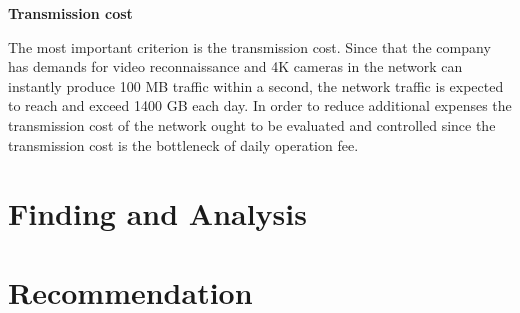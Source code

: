 \documentclass[12pt]{article}
\begin{document}
	\textbf{Transmission cost} \par 
	The most important criterion is the transmission cost. Since that the company has demands for video reconnaissance and 4K cameras in the network can instantly produce 100 MB traffic within a second, the network traffic is expected to reach and exceed 1400 GB each day. In order to reduce additional expenses the transmission cost of the network ought to be evaluated and controlled since the transmission cost is the bottleneck of daily operation fee.
	
	
	\section{Finding and Analysis}
	
	
	\section{Recommendation}
	
	
\end{document}

